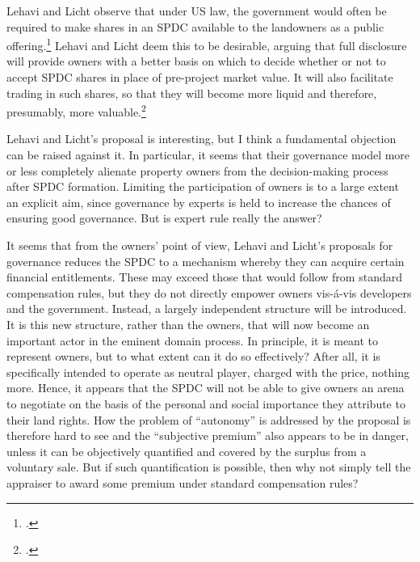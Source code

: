 Lehavi and Licht observe that under US law, the government would often be required to make shares in an SPDC available to the landowners as a public offering.\footcite[1745]{lehavi07} Lehavi and Licht deem this to be desirable, arguing that full disclosure will provide owners with a better basis on which to decide whether or not to accept SPDC shares in place of pre-project market value. It will also facilitate trading in such shares, so that they will become more liquid and therefore, presumably, more valuable.\footcite[1746]{lehavi07} 

Lehavi and Licht's proposal is interesting, but I think a fundamental objection can be raised against it. In particular, it seems that their governance model more or less completely alienate property owners from the decision-making process after SPDC formation. Limiting the participation of owners is to a large extent an explicit aim, since governance by experts is held to increase the chances of ensuring good governance. But is expert rule really the answer?

It seems that from the owners' point of view, Lehavi and Licht's proposals for governance reduces the SPDC to a mechanism whereby they can acquire certain financial entitlements. These may exceed those that would follow from standard compensation rules, but they do not directly empower owners vis-{\'a}-vis developers and the government. Instead, a largely independent structure will be introduced. It is this new  structure, rather than the owners, that will now become an important actor in the eminent domain process. In principle, it is meant to represent owners, but to what extent can it do so effectively? After all, it is specifically intended to operate as neutral player, charged with  the price, nothing more. Hence, it appears that the SPDC will not be able to give owners an arena to negotiate on the basis of the personal and social importance they attribute to their land rights. How the problem of ``autonomy'' is addressed by the proposal is therefore hard to see and the ``subjective premium'' also appears to be in danger, unless it can be objectively quantified and covered by the surplus from a voluntary sale. But if such quantification is possible, then why not simply tell the appraiser to award some premium under standard compensation rules?

